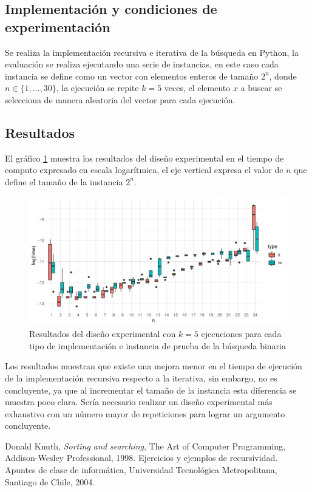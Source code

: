 \documentclass[letterpaper,11pt]{article}
\begin{document}
\subsection{Implementación y condiciones de experimentación}
Se realiza la implementación recursiva e iterativa de la búsqueda en Python, la evaluación se realiza ejecutando una serie de instancias, en este caso cada instancia se define como un vector con elementos enteros de tamaño ${2^n}$, donde $n\in \{1,\dots,30\}$, la ejecución se repite $k=5$ veces, el elemento $x$ a buscar se selecciona de manera aleatoria del vector para cada ejecución.

\subsection{Resultados}
El gráfico \ref{fig:bs} muestra los resultados del diseño experimental en el tiempo de computo expresado en escala logarítmica, el eje vertical expresa el valor de $n$ que define el tamaño de la instancia ${2^n}$.

\begin{figure}[h!]
  \includegraphics[width=\linewidth]{bs.pdf}
  \caption{Resultados del diseño experimental con $k=5$ ejecuciones para cada tipo de implementación e instancia de prueba de la búsqueda binaria}
  \label{fig:bs}
\end{figure}


Los resultados muestran que existe una mejora menor en el tiempo de ejecución de la implementación recursiva respecto a la iterativa, sin embargo, no es concluyente, ya que al incrementar el tamaño de la instancia esta diferencia se muestra poco clara. Sería necesario realizar un diseño experimental más exhaustivo con un número mayor de repeticiones para lograr un argumento concluyente.

\begin{thebibliography}{0}
   Donald Knuth, \textit{Sorting and searching}, The Art of Computer Programming, Addison-Wesley Professional, 1998.
   Ejercicios y ejemplos de recursividad. Apuntes de clase de informática, Universidad Tecnológica Metropolitana, Santiago de Chile, 2004.
\end{thebibliography}
\end{document}
